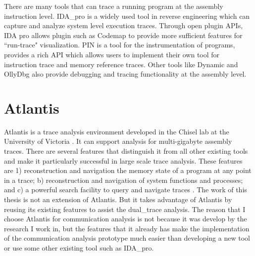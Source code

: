 There are many tools that can trace a running program at the assembly instruction level.  IDA\_pro \cite{eagle_ida_2008} is a widely used tool in reverse engineering which can capture and analyze system level execution traces. Through open plugin APIs, IDA pro allows plugin such as Codemap \cite{_c0demap/codemap:_????} to provide more sufficient features for ``run-trace" visualization. PIN \cite{_pin_????} is a tool for the instrumentation of programs, provides a rich API which allows users to implement their own tool for instruction trace and memory reference traces. Other tools like Dynamic \cite{brueningqz} and OllyDbg \cite{yuschuk2007ollydbg} also provide debugging and tracing functionality at the assembly level. 

\section{Atlantis}
Atlantis is a trace analysis environment developed in the Chisel lab at the University of Victoria \cite{huang2017atlantis}. It can support analysis for multi-gigabyte assembly traces. There are several features that distinguish it from all other existing tools and make it particularly successful in large scale trace analysis. These features are 1) reconstruction and navigation the memory state of a program at any point in a trace; b) reconstruction and navigation of system functions and processes; and c) a powerful search facility to query and navigate traces \cite{huang2017atlantis}. The work of this thesis is not an extension of Atlantis. But it takes advantage of Atlantis by reusing its existing features to assist the dual\_trace analysis. The reason that I choose Atlantis for communication analysis is not because it was develop by the research I work in, but the features that it already has make the implementation of the communication analysis prototype much easier than developing a new tool or use some other existing tool such as IDA\_pro.




